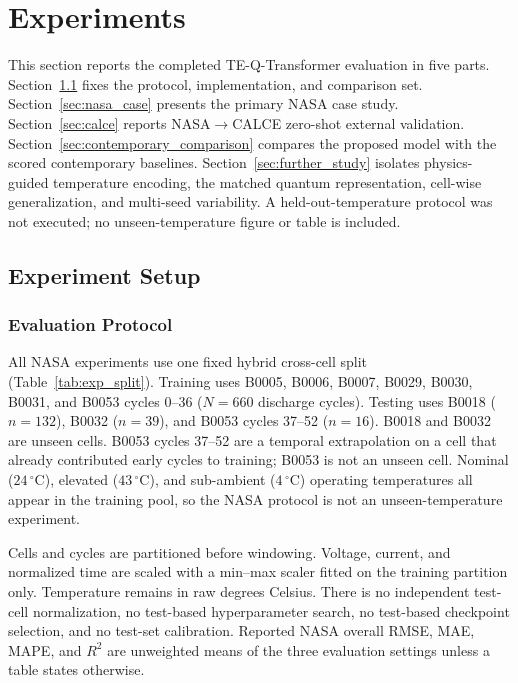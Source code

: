 \section{Experiments}\label{sec:experiments}\label{sec:results}

This section reports the completed TE-Q-Transformer evaluation in five parts. Section~\ref{sec:experiment_setup} fixes the protocol, implementation, and comparison set. Section~\ref{sec:nasa_case} presents the primary NASA case study. Section~\ref{sec:calce} reports NASA$\rightarrow$CALCE zero-shot external validation. Section~\ref{sec:contemporary_comparison} compares the proposed model with the scored contemporary baselines. Section~\ref{sec:further_study} isolates physics-guided temperature encoding, the matched quantum representation, cell-wise generalization, and multi-seed variability. A held-out-temperature protocol was not executed; no unseen-temperature figure or table is included.

\subsection{Experiment Setup}
\label{sec:experiment_setup}

\subsubsection{Evaluation Protocol}
\label{sec:evaluation_protocol}

All NASA experiments use one fixed hybrid cross-cell split (Table~\ref{tab:exp_split}). Training uses B0005, B0006, B0007, B0029, B0030, B0031, and B0053 cycles 0--36 ($N=660$ discharge cycles). Testing uses B0018 ($n=132$), B0032 ($n=39$), and B0053 cycles 37--52 ($n=16$). B0018 and B0032 are unseen cells. B0053 cycles 37--52 are a temporal extrapolation on a cell that already contributed early cycles to training; B0053 is not an unseen cell. Nominal ($24\,^\circ$C), elevated ($43\,^\circ$C), and sub-ambient ($4\,^\circ$C) operating temperatures all appear in the training pool, so the NASA protocol is not an unseen-temperature experiment.

Cells and cycles are partitioned before windowing. Voltage, current, and normalized time are scaled with a min--max scaler fitted on the training partition only. Temperature remains in raw degrees Celsius. There is no independent test-cell normalization, no test-based hyperparameter search, no test-based checkpoint selection, and no test-set calibration. Reported NASA overall RMSE, MAE, MAPE, and $R^2$ are unweighted means of the three evaluation settings unless a table states otherwise.

